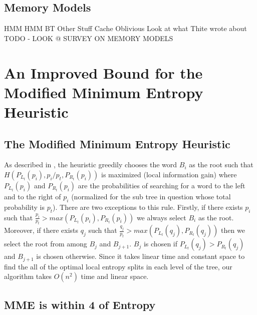 \documentclass[letterpaper,12pt,titlepage,oneside,final]{book}
\theoremstyle{plain}
\begin{document}
\section{Memory Models}

HMM
HMM BT
Other Stuff
Cache Oblivious
Look at what Thite wrote about
TODO - LOOK @ SURVEY ON MEMORY MODELS


\chapter{An Improved Bound for the Modified Minimum Entropy Heuristic}


\section{The Modified Minimum Entropy Heuristic}

 As described in \cite{guttler1980binary}, the heuristic greedily chooses the word $B_i$ as the root such that $H(P_{L_t}(p_i), p_i/p_t, P_{R_t}(p_i))$ is maximized (local information gain) where $P_{L_t}(p_i)$ and $P_{R_t}(p_i)$ are the probabilities of searching for a word to the left and to the right of $p_i$ (normalized for the sub tree in question whose total probability is $p_t$). There are two exceptions to this rule. Firstly, if there exists $p_i$ such that $\frac{p_i}{p_t} > max(P_{L_t}(p_i), P_{R_t}(p_i))$ we always select $B_i$ as the root. Moreover, if there exists $q_j$ such that $\frac{q_j}{p_t} > max(P_{L_t}(q_j), P_{R_t}(q_j))$ then we select the root from among $B_j$ and $B_{j+1}$. $B_j$ is chosen if $P_{L_t}(q_j) > P_{R_t}(q_j)$ and $B_{j+1}$ is chosen otherwise. Since it takes linear time and constant space to find the all of the optimal local entropy splits in each level of the tree, our algorithm takes $O(n^2)$ time and linear space.  \\

\section{MME is within 4 of Entropy}
\end{document}
